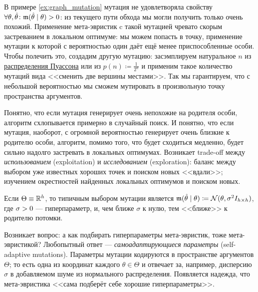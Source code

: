 \begin{example}
В примере \ref{ex:graph_mutation} мутация не удовлетворяла свойству $\forall \theta, \hat{\theta} \colon \mut(\hat{\theta} \HM\mid \theta) \HM> 0$: из текущего пути обхода мы могли получить только очень похожий. Применение мета-эвристик c такой мутацией чревато скорым застреванием в локальном оптимуме: мы можем попасть в точку, применение мутации к которой с вероятностью один даёт ещё менее приспособленные особи. Чтобы полечить это, создадим другую мутацию: засэмплируем натуральное $n$ из \href{https://ru.wikipedia.org/wiki/\%D0\%A0\%D0\%B0\%D1\%81\%D0\%BF\%D1\%80\%D0\%B5\%D0\%B4\%D0\%B5\%D0\%BB\%D0\%B5\%D0\%BD\%D0\%B8\%D0\%B5_\%D0\%9F\%D1\%83\%D0\%B0\%D1\%81\%D1\%81\%D0\%BE\%D0\%BD\%D0\%B0}{распределения Пуассона} или из $p(n) \coloneqq \frac{1}{2^n}$ и применим такое количество мутаций вида <<сменить две вершины местами>>. Так мы гарантируем, что с небольшой вероятностью мы сможем мутировать в произвольную точку пространства аргументов.
\end{example}

Понятно, что если мутация генерирует очень непохожие на родителя особи, алгоритм схлопывается примерно в случайный поиск. И понятно, что если мутация, наоборот, с огромной вероятностью генерирует очень близкие к родителю особи, алгоритм, помимо того, что будет сходиться медленно, будет сильно надолго застревать в локальных оптимумах. Возникает trade-off между \emph{использованием} (exploitation) и \emph{исследованием} (exploration): баланс между выбором уже известных хороших точек и поиском новых <<вдали>>; изучением окрестностей найденных локальных оптимумов и поиском новых. 

\begin{exampleBox}[label=ex:gaussianmutation]{}
Если $\Theta \HM\equiv \R^h$, то типичным выбором мутации является $\mut(\hat{\theta} \HM\mid \theta) \HM\coloneqq \N(\theta, \sigma^2I_{h \times h})$, где $\sigma \HM> 0$ --- гиперпараметр, и, чем ближе $\sigma$ к нулю, тем <<ближе>> к родителю потомки.
\end{exampleBox}

\begin{remark}
Возникает вопрос: а как подбирать гиперпараметры мета-эвристик, тоже мета-эвристикой? Любопытный ответ --- \emph{самоадаптирующиеся параметры} (self-adaptive mutations). Параметры мутации кодируются в пространстве аргументов $\Theta$; то есть одна из координат каждого $\theta \in \Theta$ и отвечает за, например, дисперсию $\sigma$ в добавляемом шуме из нормального распределения. Появляется надежда, что мета-эвристика <<сама подберёт себе хорошие гиперпараметры>>.
\end{remark}

